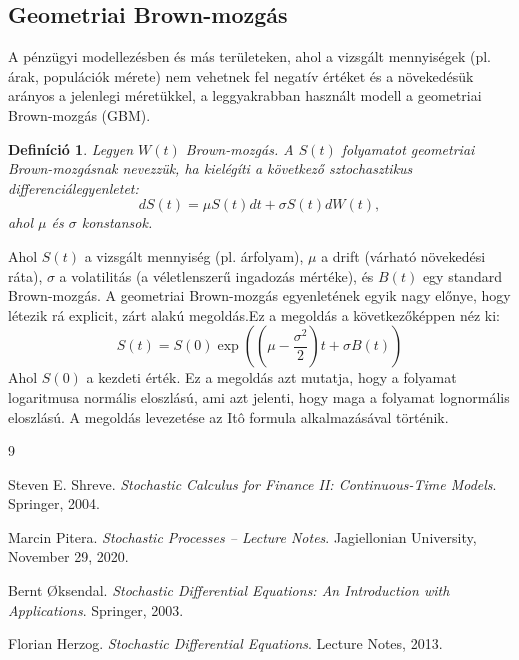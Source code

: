 \documentclass[12pt, a4paper]{article}
\newtheorem{definition}{Definíció}[subsection]
\begin{document}
\subsection{Geometriai Brown-mozgás}

A pénzügyi modellezésben és más területeken, ahol a vizsgált mennyiségek (pl. árak, populációk mérete) nem vehetnek fel negatív értéket és a növekedésük arányos a jelenlegi méretükkel, a leggyakrabban használt modell a geometriai Brown-mozgás (GBM).

\begin{definition}\label{def_tizenotodik}
Legyen $W(t)$ Brown-mozgás. A $S(t)$ folyamatot geometriai Brown-mozgásnak nevezzük, ha kielégíti a következő sztochasztikus differenciálegyenletet:
\[
dS(t) = \mu S(t)dt + \sigma S(t)dW(t),
\]
ahol $\mu$ és $\sigma$ konstansok.
\end{definition}

Ahol $S(t)$ a vizsgált mennyiség (pl. árfolyam), $\mu$ a drift (várható növekedési ráta), $\sigma$ a volatilitás (a véletlenszerű ingadozás mértéke), és $B(t)$ egy standard Brown-mozgás. A geometriai Brown-mozgás egyenletének egyik nagy előnye, hogy létezik rá explicit, zárt alakú megoldás.Ez a megoldás a következőképpen néz ki:
\[
S(t) = S(0) \exp\left( \left(\mu - \frac{\sigma^2}{2}\right)t + \sigma B(t) \right)
\]
Ahol $S(0)$ a kezdeti érték. Ez a megoldás azt mutatja, hogy a folyamat logaritmusa normális eloszlású, ami azt jelenti, hogy maga a folyamat lognormális eloszlású. A megoldás levezetése az Itô formula alkalmazásával történik.

\begin{thebibliography}{9}

Steven E. Shreve. \textit{Stochastic Calculus for Finance II: Continuous-Time Models}. Springer, 2004.

Marcin Pitera. \textit{Stochastic Processes – Lecture Notes}. Jagiellonian University, November 29, 2020.

Bernt Øksendal. \textit{Stochastic Differential Equations: An Introduction with Applications}. Springer, 2003.

Florian Herzog. \textit{Stochastic Differential Equations}. Lecture Notes, 2013.

\end{thebibliography}
\end{document}
